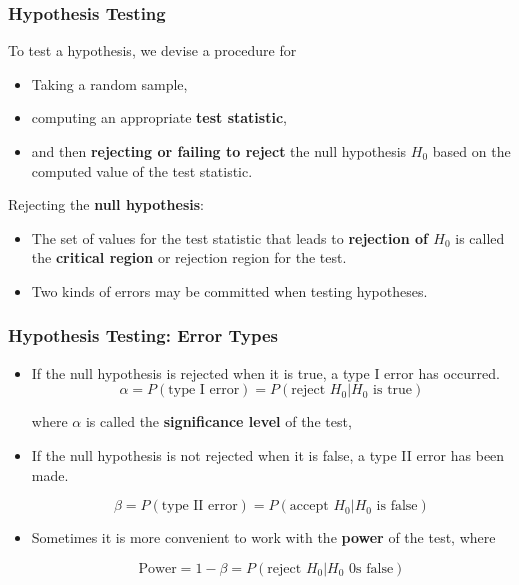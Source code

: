 \begin{frame}
    \frametitle{Hypothesis Testing}

    To test a hypothesis, we devise a procedure for

    \begin{itemize}
        \item Taking a random sample,
        \item computing an appropriate \textbf{test statistic},
        \item and then \textbf{rejecting or failing to reject} the null hypothesis $H_0$ based on 
        the computed value of the test statistic. 


    \end{itemize}

    Rejecting the \textbf{null hypothesis}:
    \begin{itemize}
        \item The set of values for the test statistic that leads to \textbf{rejection of $H_0$} 
        is called the \textbf{critical region} or rejection region for the test.
        \item Two kinds of errors may be committed when testing hypotheses.
    \end{itemize}
    
\end{frame}


\begin{frame}
    \frametitle{Hypothesis Testing: Error Types}
    \begin{itemize}
        \item If the null hypothesis is rejected when it is true, a 
        type I error has occurred. 
        $$\alpha = P(\text{type I error}) = P(\text{reject $H_0$}|\text{$H_0$ is true})$$

        where $\alpha$ is called the \textbf{significance level} of the test,

        \item If the null hypothesis is not rejected when it is false, a type II 
        error has been made.

        $$\beta = P(\text{type II error}) = P(\text{accept $H_0$}|\text{$H_0$ is false})$$

        \item Sometimes it is more convenient to work with the \textbf{power} of the test, where

        $$\text{Power} = 1 - \beta = P(\text{reject $H_0$}|\text{$H_0$ 0s false})$$
    \end{itemize}
\end{frame}

